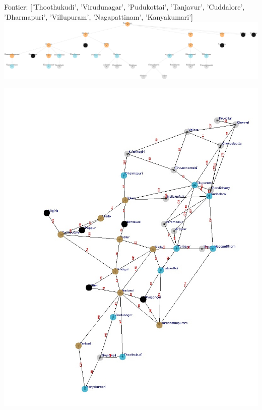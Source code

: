 \documentclass[xcolor=table]{beamer}
\begin{document}
\begin{frame}
  { \tiny Fontier: ['Thoothukudi', 'Virudunagar', 'Pudukottai', 'Tanjavur', 'Cuddalore', 'Dharmapuri', 'Villupuram', 'Nagapattinam', 'Kanyakumari']}
  \includegraphics[width=1\textwidth]{../BFSNodes/21-1.png}
  \begin{center}
    \includegraphics[height=0.55\textheight]{../BFSoutput/tamilBFS19.jpg}
  \end{center}
\end{frame}
\end{document}
